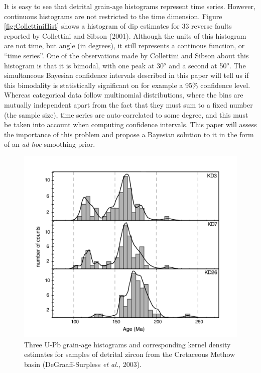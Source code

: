 \documentclass{article}
\begin{document}
It is  easy to see  that detrital grain-age histograms  represent time
series.  However, continuous histograms are not restricted to the time
dimension.  Figure  \ref{fig:CollettiniHist} shows a  histogram of dip
estimates  for 33  reverse faults  reported by  Collettini  and Sibson
(2001).  Although the units of  this histogram are not time, but angle
(in  degrees), it  still represents  a continous  function,  or ``time
series''.  One of the observations made by Collettini and Sibson about
this histogram  is that it is bimodal,  with one peak at  30$^o$ and a
second  at  50$^o$.  The  simultaneous  Bayesian confidence  intervals
described  in  this   paper  will  tell  us  if   this  bimodality  is
statistically  significant on  for  example a  95\% confidence  level.
Whereas categorical  data follow multinomial  distributions, where the
bins are mutually  independent apart from the fact  that they must sum
to a fixed  number (the sample size), time  series are auto-correlated
to some  degree, and  this must be  taken into account  when computing
confidence intervals.   This paper will assess the  importance of this
problem and propose  a Bayesian solution to it in the  form of an {\it
ad hoc} smoothing prior.

\begin{figure}[h]
  \centering
  \includegraphics[width=12cm]{SurplessMethowSamples.pdf}
  \caption{Three U-Pb grain-age histograms and corresponding kernel density
estimates for  samples of detrital  zircon from the  Cretaceous Methow
basin (DeGraaff-Surpless {\it et al.}, 2003).}
  \label{fig:Surpless}
\end{figure}
\end{document}
